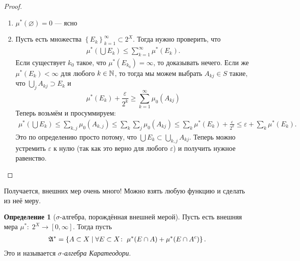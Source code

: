 \documentclass[a4paper,14pt]{extarticle}
\newcounter{theoremCnt}
\theoremstyle{definition}
\newtheorem{df}[theoremCnt]{Определение}
\theoremstyle{plain}
\theoremstyle{plain}
\theoremstyle{plain}
\theoremstyle{plain}
\theoremstyle{definition}
\theoremstyle{definition}
\theoremstyle{definition}
\theoremstyle{definition}
\theoremstyle{definition}
\theoremstyle{definition}
\theoremstyle{plain}
\theoremstyle{plain}
\theoremstyle{plain}
\theoremstyle{plain}
\theoremstyle{definition}
\theoremstyle{definition}
\theoremstyle{definition}
\theoremstyle{definition}
\theoremstyle{definition}
\newcommand{\N}{\ensuremath \mathbb{N}}
\newcommand{\A}{\ensuremath \mathfrak{A}}
\begin{document}
\begin{proof}\
 \begin{enumerate}
  \item $ \mu^\ast(\varnothing) = 0 $ --- ясно
  \item Пусть есть множества $ \left\{ E_k \right\}_{k=1}^\infty \subset 2^X$. Тогда нужно проверить, что
  \begin{align*}
   \mu^\ast\left( \bigcup E_k \right) \leqslant \sum_{k=1}^{\infty} \mu^\ast(E_k)
   .\end{align*} Если существует $ k_0 $ такое, что $ \mu^\ast(E_{k_0}) = \infty $, то доказывать нечего. Если же $ \mu^\ast(E_k) < \infty $ для любого $ k \in \N $, то тогда мы можем выбрать $ A_{kj} \in S $ такие, что $ \bigcup_j A_{kj} \supset E_k $ и $$ \mu^\ast(E_k) + \frac{\varepsilon}{2^k} \geqslant \sum_{k=1}^{\infty} \mu_0(A_{kj}) $$ Теперь возьмём и просуммируем:
  \begin{align*}
   \mu^\ast\left( \bigcup E_k \right) \leqslant \sum_{k,j} \mu_0(A_{k,j}) \leqslant \sum_k \sum_j \mu_0(A_{kj}) \leqslant \sum_{k} \mu^\ast(E_k) + \frac{\varepsilon}{2^k} \leqslant \varepsilon + \sum_k \mu^\ast(E_k)
   .\end{align*} Это по определению просто потому, что $ \bigcup E_k \subset \bigcup_{k,j} A_{kj} $. Теперь можно устремить $ \varepsilon $ к нулю (так как это верно для любого $ \varepsilon $) и получить нужное равенство.
 \end{enumerate}
\end{proof}
Получается, внешних мер очень много! Можно взять любую функцию и сделать из неё меру.

\begin{df}[$ \sigma $-алгебра, порождённая внешней мерой]
 Пусть есть внешняя мера $ \mu^\ast \colon\; 2^X \to [0,\infty] $. Тогда пусть \begin{align*}
  \A^\ast = \left\{ A \subset X \mid \forall E \subset X \colon\; \mu^\ast (E \cap A) + \mu^\ast(E \cap A^c) \right\}
  .\end{align*}
 Это и называется \textit{$ \sigma $-алгебра Каратеодори}.
\end{df}
\end{document}
